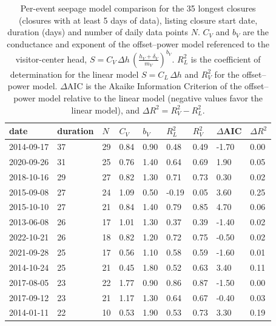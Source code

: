 \begin{table}[]
    \centering
\caption{Per-event seepage model comparison for the 35 longest closures (closures with at least 5 days of data), listing closure start date, duration (days) and number of daily data points $N$. $C_V$ and $b_V$ are the conductance and exponent of the offset--power model referenced to the visitor-center head, $S = C_V\,\Delta h\,\left(\frac{h_V+\delta_V}{m_V}\right)^{b_V}$. $R^2_L$ is the coefficient of determination for the linear model $S = C_L\,\Delta h$ and $R^2_V$ for the offset--power model. $\Delta$AIC is the Akaike Information Criterion of the offset--power model relative to the linear model (negative values favor the linear model), and $\Delta R^2 = R^2_V - R^2_L$.}
    \small
\begin{tabular}{lll|ll|ll|ll}
\hline
date & duration & $N$ & $C_V$ & $b_V$ & $R^2_L$ & $R^2_V$ & $\Delta$AIC & $\Delta R^2$ \\
\hline
2014-09-17 & 37 & 29 & 0.84 & 0.90 & 0.48 & 0.49 & -1.70 & 0.00 \\
2020-09-26 & 31 & 25 & 0.76 & 1.40 & 0.64 & 0.69 & 1.90 & 0.05 \\
2018-10-16 & 29 & 27 & 0.82 & 1.30 & 0.71 & 0.73 & 0.30 & 0.02 \\
2015-09-08 & 27 & 24 & 1.09 & 0.50 & -0.19 & 0.05 & 3.60 & 0.25 \\
2015-10-10 & 27 & 21 & 0.84 & 1.40 & 0.79 & 0.85 & 4.70 & 0.06 \\
2013-06-08 & 26 & 17 & 1.01 & 1.30 & 0.37 & 0.39 & -1.40 & 0.02 \\
2022-10-21 & 26 & 18 & 0.82 & 1.20 & 0.72 & 0.75 & -0.50 & 0.02 \\
2021-09-28 & 25 & 17 & 0.56 & 1.10 & 0.58 & 0.59 & -1.60 & 0.01 \\
2014-10-24 & 25 & 21 & 0.45 & 1.80 & 0.52 & 0.63 & 3.40 & 0.11 \\
2017-08-05 & 23 & 22 & 1.77 & 0.90 & 0.86 & 0.87 & -1.50 & 0.00 \\
2017-09-12 & 23 & 21 & 1.17 & 1.30 & 0.64 & 0.67 & -0.40 & 0.03 \\
2014-01-11 & 22 & 10 & 0.53 & 1.90 & 0.53 & 0.73 & 3.30 & 0.19 \\

\end{tabular}
\end{table}
